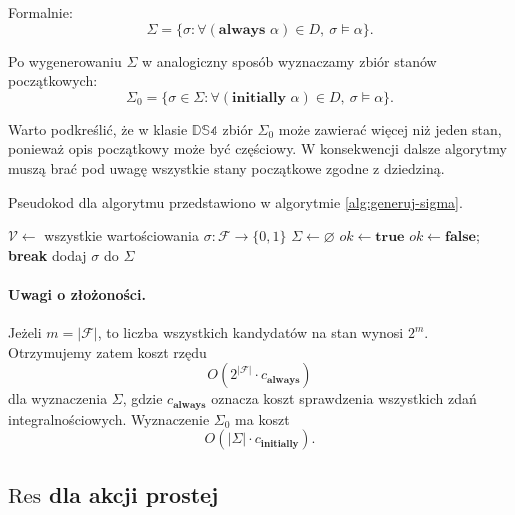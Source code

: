 \documentclass[11pt,a4paper]{article}
\theoremstyle{definition}
\begin{document}
Formalnie:
\[
\Sigma = \{\sigma : \forall (\textbf{always } \alpha)\in D,\ \sigma \models \alpha\}.
\]

Po wygenerowaniu $\Sigma$ w analogiczny sposób wyznaczamy zbiór stanów początkowych:
\[
\Sigma_0 = \{\sigma \in \Sigma : \forall (\textbf{initially } \alpha)\in D,\ \sigma \models \alpha\}.
\]

Warto podkreślić, że w klasie $\mathbb{DS4}$ zbiór $\Sigma_0$ może zawierać więcej niż jeden stan, ponieważ opis początkowy może być częściowy. W konsekwencji dalsze algorytmy muszą brać pod uwagę wszystkie stany początkowe zgodne z dziedziną.

Pseudokod dla algorytmu przedstawiono w algorytmie \ref{alg:generuj-sigma}.

\begin{algorithm}[H]
\caption{Pseudokod dla algorytmu generującego zbiór stanów dopuszczalnych}
\label{alg:generuj-sigma}
\begin{algorithmic}[1]
        \State $\mathcal{V} \gets$ wszystkie wartościowania $\sigma \colon \mathcal{F} \to \{0,1\}$
        \State $\Sigma \gets \varnothing$
            \State $ok \gets \textbf{true}$
                \If{$\sigma \not\models \alpha$}
                    \State $ok \gets \textbf{false}$; \textbf{break}
                \EndIf
            \EndFor
                \State dodaj $\sigma$ do $\Sigma$
            \EndIf
        \EndFor
        
        \Return{$\Sigma$}
    \EndProcedure
\end{algorithmic}
\end{algorithm}

\paragraph{Uwagi o złożoności.}
Jeżeli $m = |\mathcal{F}|$, to liczba wszystkich kandydatów na stan wynosi $2^m$. Otrzymujemy zatem koszt rzędu
\[
O(2^{|\mathcal{F}|} \cdot c_{\textbf{always}})
\]
dla wyznaczenia $\Sigma$, gdzie $c_{\textbf{always}}$ oznacza koszt sprawdzenia wszystkich zdań integralnościowych. Wyznaczenie $\Sigma_0$ ma koszt
\[
O(|\Sigma| \cdot c_{\textbf{initially}}).
\]

\subsection{\texorpdfstring{$\mathrm{Res}$}{Res} dla akcji prostej}
\label{sec:alg-res-simple}
\end{document}
